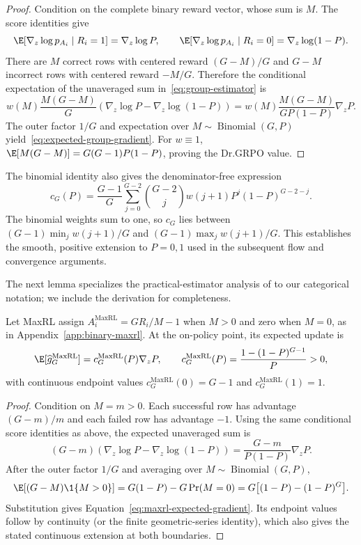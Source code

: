 \begin{proof}
Condition on the complete binary reward vector, whose sum is $M$. The score
identities give
\[
  \E[\nabla_z\log p_{A_i}\mid R_i=1]=\nabla_z\log P,
  \qquad
  \E[\nabla_z\log p_{A_i}\mid R_i=0]
  =\nabla_z\log(1-P).
\]
There are $M$ correct rows with centered reward $(G-M)/G$ and $G-M$
incorrect rows with centered reward $-M/G$. Therefore the conditional
expectation of the unaveraged sum in~\eqref{eq:group-estimator} is
\[
  w(M)\frac{M(G-M)}{G}
  \left(\nabla_z\log P-\nabla_z\log(1-P)\right)
  =w(M)\frac{M(G-M)}{GP(1-P)}\nabla_zP.
\]
The outer factor $1/G$ and expectation over
$M\sim\operatorname{Binomial}(G,P)$ yield~\eqref{eq:expected-group-gradient}.
For $w\equiv1$,
$\E[M(G-M)]=G(G-1)P(1-P)$, proving the Dr.GRPO value.
\end{proof}

The binomial identity also gives the denominator-free expression
\[
 c_G(P)=\frac{G-1}{G}\sum_{j=0}^{G-2}\binom{G-2}{j}
 w(j+1)P^j(1-P)^{G-2-j}.
\]
The binomial weights sum to one, so $c_G$ lies between
$(G-1)\min_j w(j+1)/G$ and $(G-1)\max_j w(j+1)/G$.
This establishes the smooth, positive extension to $P=0,1$ used in the
subsequent flow and convergence arguments.

The next lemma specializes the practical-estimator analysis of
\citet[Section~4.3 and Appendix~D, Theorem~5]{tajwar2026maxrl}
to our categorical notation; we include the derivation for completeness.

\begin{lemma}
\label{lem:maxrl-mean}
Let MaxRL assign
$A_i^{\mathrm{MaxRL}}=GR_i/M-1$ when $M>0$ and zero when $M=0$, as in
Appendix~\ref{app:binary-maxrl}. At the on-policy point, its expected update is
\begin{equation}
  \E[\widehat g_G^{\mathrm{MaxRL}}]
  =c_G^{\mathrm{MaxRL}}(P)\nabla_zP,
  \qquad
  c_G^{\mathrm{MaxRL}}(P)
  =\frac{1-(1-P)^{G-1}}{P}>0,
  \label{eq:maxrl-expected-gradient}
\end{equation}
with continuous endpoint values
$c_G^{\mathrm{MaxRL}}(0)=G-1$ and
$c_G^{\mathrm{MaxRL}}(1)=1$.
\end{lemma}

\begin{proof}
Condition on $M=m>0$. Each successful row has advantage $(G-m)/m$ and each
failed row has advantage $-1$. Using the same conditional score identities as
above, the expected unaveraged sum is
\[
  (G-m)\!\left(\nabla_z\log P-\nabla_z\log(1-P)\right)
  =\frac{G-m}{P(1-P)}\nabla_zP.
\]
After the outer factor $1/G$ and averaging over
$M\sim\operatorname{Binomial}(G,P)$,
\[
 \E[(G-M)\1\{M>0\}]
 =G(1-P)-G\Pr(M=0)
 =G\big[(1-P)-(1-P)^G\big].
\]
Substitution gives Equation~\eqref{eq:maxrl-expected-gradient}. Its endpoint
values follow by continuity (or the finite geometric-series identity), which
also gives the stated continuous extension at both boundaries.
\end{proof}

